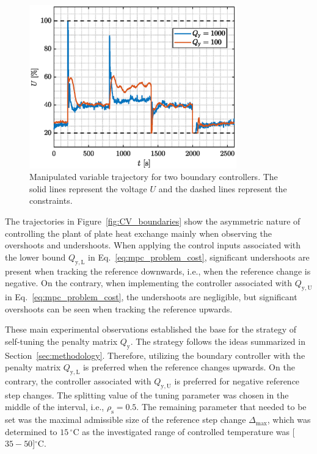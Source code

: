 \documentclass[preprint,12pt]{elsarticle}
\begin{document}
\begin{figure}
	\begin{center}
		\includegraphics[width=0.8\textwidth]{images/MV_boundaries}
		\caption{Manipulated variable trajectory for two boundary controllers. The solid lines represent the voltage $U$ and the dashed lines represent the constraints.}
		\label{fig:MV_boundaries}
	\end{center}
\end{figure}

The trajectories in Figure~\ref{fig:CV_boundaries} show the asymmetric nature of controlling the plant of plate heat exchange mainly when observing the overshoots and undershoots. When applying the control inputs associated with the lower bound $Q_\mathrm{y, L}$ in Eq.~\eqref{eq:mpc_problem_cost}, significant undershoots are present when tracking the reference downwards, i.e., when the reference change is negative. On the contrary, when implementing the controller associated with $Q_\mathrm{y, U}$ in Eq.~\eqref{eq:mpc_problem_cost}, the undershoots are negligible, but significant overshoots can be seen when tracking the reference upwards.

These main experimental observations established the base for the strategy of self-tuning the penalty matrix $Q_\mathrm{y}$. The strategy follows the ideas summarized in Section~\ref{sec:methodology}. Therefore, utilizing the boundary controller with the penalty matrix $Q_\mathrm{y, L}$ is preferred when the reference changes upwards. On the contrary, the controller associated with $Q_\mathrm{y, U}$ is preferred for negative reference step changes. The splitting value of the tuning parameter was chosen in the middle of the interval, i.e., $\rho_{\mathrm{s}} = 0.5$. The remaining parameter that needed to be set was the maximal admissible size of the reference step change $\Delta_{\max}$, which was determined to $15\,^{\circ}\mathrm{C}$ as the investigated range of controlled temperature was [$35-50$]$^{\circ}\mathrm{C}$. 
\end{document}
